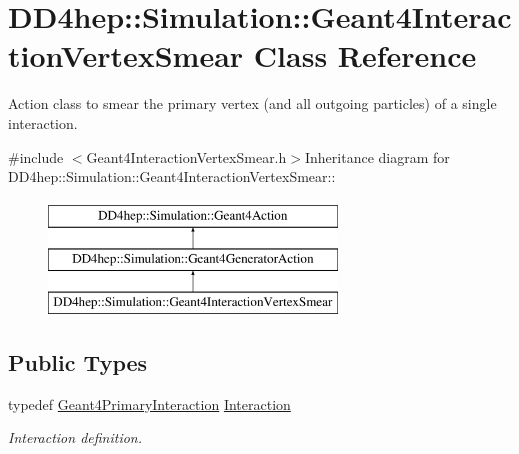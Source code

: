 \hypertarget{class_d_d4hep_1_1_simulation_1_1_geant4_interaction_vertex_smear}{
\section{DD4hep::Simulation::Geant4InteractionVertexSmear Class Reference}
\label{class_d_d4hep_1_1_simulation_1_1_geant4_interaction_vertex_smear}
}


Action class to smear the primary vertex (and all outgoing particles) of a single interaction.  


{\ttfamily \#include $<$Geant4InteractionVertexSmear.h$>$}Inheritance diagram for DD4hep::Simulation::Geant4InteractionVertexSmear::\begin{figure}[H]
\begin{center}
\leavevmode
\includegraphics[height=3cm]{class_d_d4hep_1_1_simulation_1_1_geant4_interaction_vertex_smear}
\end{center}
\end{figure}
\subsection*{Public Types}
\begin{DoxyCompactItemize}
\item 
typedef \hyperlink{class_d_d4hep_1_1_simulation_1_1_geant4_primary_interaction}{Geant4PrimaryInteraction} \hyperlink{class_d_d4hep_1_1_simulation_1_1_geant4_interaction_vertex_smear_ab70397967639759170996f67855a8c74}{Interaction}
\begin{DoxyCompactList}\small\item\em Interaction definition. \item\end{DoxyCompactList}\end{DoxyCompactItemize}
